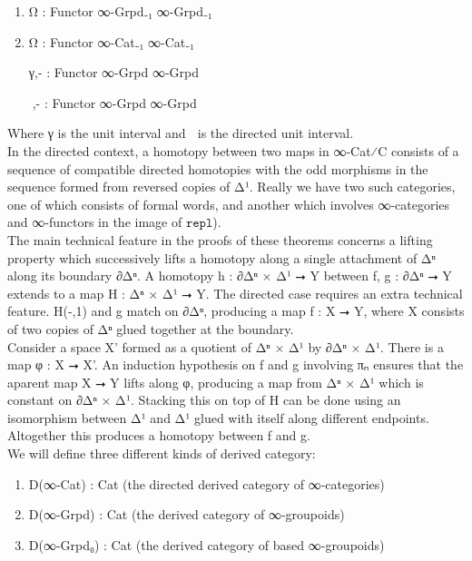 \documentclass{book}
\theoremstyle{definition}
\begin{document}
\begin{enumerate}
\item Ω : Functor ∞-Grpd₋₁ ∞-Grpd₋₁
\item Ω⃗ : Functor ∞-Cat₋₁ ∞-Cat₋₁
\item [γ,-] : Functor ∞-Grpd ∞-Grpd
\item [γ⃗,-] : Functor ∞-Grpd ∞-Grpd
\end{enumerate}

Where γ is the unit interval and γ⃗ is the directed unit interval.\\

\iffalse
In the directed context, a homotopy between two maps in ∞-Cat⁄C consists of a sequence of compatible directed homotopies with the odd morphisms in the sequence formed from reversed copies of Δ¹. Really we have two such categories, one of which consists of formal words, and another which involves ∞-categories and ∞-functors in the image of $\texttt{repl}$).\\

The main technical feature in the proofs of these theorems concerns a lifting property which successively lifts a homotopy along a single attachment of Δⁿ along its boundary ∂Δⁿ. A homotopy h : ∂Δⁿ × Δ¹ ⭢ Y between f, g : ∂Δⁿ ⭢ Y extends to a map H : Δⁿ × Δ¹ ⭢ Y. The directed case requires an extra technical feature. H(-,1) and g match on ∂Δⁿ, producing a map f : X ⭢ Y, where X consists of two copies of Δⁿ glued together at the boundary.\\

Consider a space X' formed as a quotient of Δⁿ × Δ¹ by ∂Δⁿ × Δ¹. There is a map φ : X ⭢ X'. An induction hypothesis on f and g involving πₙ ensures that the aparent map X ⭢ Y lifts along φ, producing a map from Δⁿ × Δ¹ which is constant on ∂Δⁿ × Δ¹. Stacking this on top of H can be done using an isomorphism between Δ¹ and Δ¹ glued with itself along different endpoints. Altogether this produces a homotopy between f and g.\\

We will define three different kinds of derived category:\\

\begin{enumerate}
\item D(∞-Cat) : Cat (the directed derived category of ∞-categories)
\item D(∞-Grpd) : Cat (the derived category of ∞-groupoids)
\item D(∞-Grpd₀) : Cat (the derived category of based ∞-groupoids)
\end{enumerate}
\end{document}
